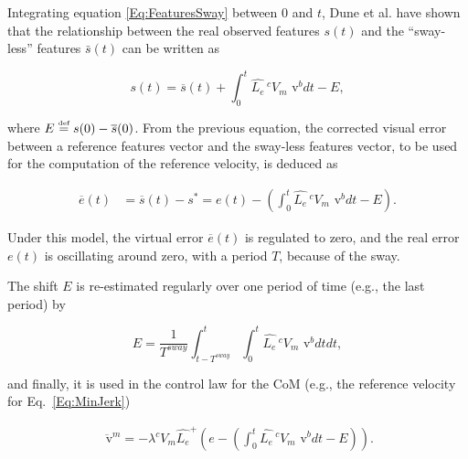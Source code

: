 

Integrating equation \ref{Eq:FeaturesSway} between $0$ and $t$, Dune et al. have shown that the relationship between the real observed features $s(t)$ and the ``sway-less'' features $\bar{s}(t)$ can be written as

\begin{equation}
s(t) = \overline{s}(t) + \int_{0}^{t} {{\widehat{ L_e}}} \, ^c  V_{m} \text{ v}^b dt - E,
\end{equation}

\noindent where $E \stackrel{\mbox{\tiny def}}{=} s(0)-\overline{s}(0)$. From the previous equation, the corrected visual error between a reference features vector and the sway-less features vector, to be used for the computation of the reference velocity, is deduced as

\begin{align}
\overline{e}(t)&=\overline{s}(t) -s^*= e(t) -  (\int_{0}^{t}{ {\widehat{ L_e}}} \, ^c  V_m \text{ v}^b dt -E).
\end{align}

Under this model, the virtual error $\overline{e}(t)$ is regulated to zero, and the real error $e(t)$ is oscillating around zero, with a period $T$, because of the sway.

The shift $E$ is re-estimated regularly over one period of time (e.g., the last period) by 

$$
E= \frac{1}{T^{sway}}\int_{t-T^{sway}}^t\int_0^t { {\widehat{ L_e}}} \, ^c  V_m \text{ v}^b  dt dt,
$$ 

\noindent and finally, it is used in the control law for the CoM (e.g., the reference velocity for Eq.~\ref{Eq:MinJerk}) 

\begin{gather} 
\overline{\text{ v}}^m= -\lambda{ ^c  V_m {{ {\widehat{ L_e}}}}^{+}}(e -  (\int_{0}^{t}{{ {\widehat{ L_e}}}} \, ^c  V_{m}\text{ v}^b dt - E)).
\label{eq:avControlCom} 
\end{gather} 

